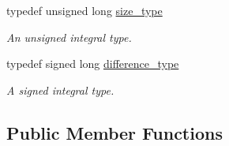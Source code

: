 \begin{DoxyCompactItemize}
\item 
typedef unsigned long \hyperlink{classmetrobotics_1_1Lerp_a10263c93dd1cabed5b5c06585f13c272}{size\-\_\-type}
\begin{DoxyCompactList}\small\item\em \-An unsigned integral type. \end{DoxyCompactList}\item 
typedef signed long \hyperlink{classmetrobotics_1_1Lerp_ab33debb53d79b253af93112e65630909}{difference\-\_\-type}
\begin{DoxyCompactList}\small\item\em \-A signed integral type. \end{DoxyCompactList}\end{DoxyCompactItemize}
\subsection*{\-Public \-Member \-Functions}
